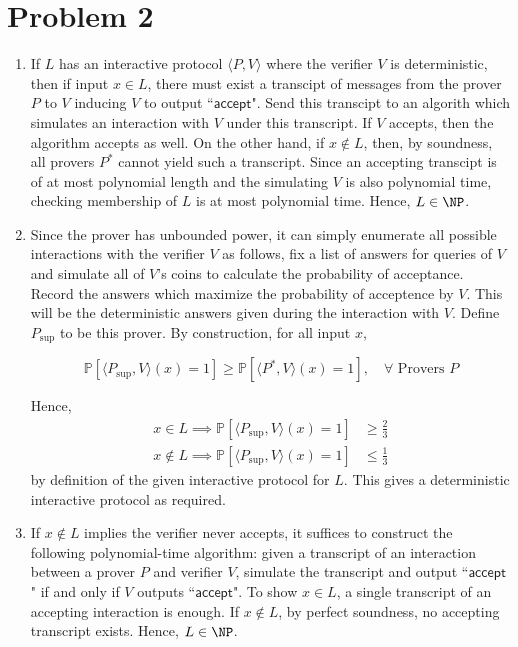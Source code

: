 \documentclass[12pt]{article}%
\begin{document}
\section*{Problem 2}
\begin{enumerate}
  \item If $L$ has an interactive protocol $ \langle P, V \rangle$ where the verifier $V$ is deterministic, then if input $x \in L$, there must exist a transcipt of messages from the prover $P$ to $V$ inducing $V$ to output ``$\mathsf{accept}$". Send this transcipt to an algorith which simulates an interaction with $V$ under this transcript. If $V$ accepts, then the algorithm accepts as well. On the other hand, if $x \not\in L$, then, by soundness, all provers $P^*$ cannot yield such a transcript. Since an accepting transcipt is of at most polynomial length and the simulating $V$ is also polynomial time, checking membership of $L$ is at most polynomial time. Hence, $L \in \NP$.

  \item Since the prover has unbounded power, it can simply enumerate all possible interactions with the verifier $V$ as follows, fix a list of answers for queries of $V$ and simulate all of $V$'s coins to calculate the probability of acceptance. Record the answers which maximize the probability of acceptence by $V$. This will be the deterministic answers given during the interaction with $V$. Define $P_{\sup}$ to be this prover. By construction, for all input $x$,

  $$ \mathbb{P}[\langle P_{\sup}, V \rangle(x) = 1] \geq   \mathbb{P}[\langle P^*, V \rangle(x) = 1], \quad \forall\text{ Provers } P $$

  Hence,
  \begin{align*}
    x \in L \implies  \mathbb{P}[\langle P_{\sup}, V  \rangle(x) = 1] & \geq  \frac{2}{3} \\
    x \not\in L \implies \mathbb{P}[\langle P_{\sup}, V  \rangle(x) = 1] & \leq  \frac{1}{3}
  \end{align*}
  by definition of the given interactive protocol for $L$. This gives a deterministic interactive protocol as required.

  \item
  If $x \not\in L$ implies the verifier never accepts, it suffices to construct the following polynomial-time algorithm: given a transcript of an interaction between a prover $P$ and verifier $V$, simulate the transcript and output ``$\mathsf{accept}$" if and only if $V$ outputs ``$\mathsf{accept}$". To show $x \in L$, a single transcript of an accepting interaction is enough. If $x \not\in L$, by perfect soundness, no accepting transcript exists. Hence, $L \in \NP$.
\end{enumerate}
\end{document}
